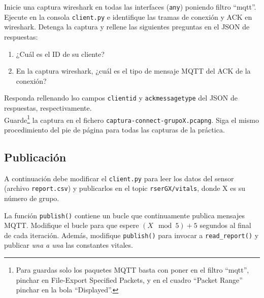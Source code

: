 \documentclass{upmassignment}
\begin{document}
\begin{problemlist}
    \pbitem Inicie una captura wireshark
        en todas las interfaces
        (\texttt{any}) poniendo filtro
        ``mqtt''. Ejecute en la consola
        \texttt{client.py} e identifique
        las tramas de conexión y ACK
        en wireshark. Detenga la captura
        y rellene las
        siguientes preguntas en el
        JSON de respuestas:
        \begin{enumerate}
            \item ¿Cuál es el ID de su cliente?
            \item En la captura wireshark,
                ¿cuál es el tipo de mensaje
                MQTT
                del ACK de la conexión?
        \end{enumerate}
        Responda rellenando lso campos
        \texttt{clientid} y
        \texttt{ackmessagetype} del JSON
        de respuestas, respectivamente.\\
        Guarde\footnote{Para guardas solo los paquetes MQTT
                basta con poner en el filtro
                ``mqtt'',
                pinchar en
                File-Export Specified Packets,
                y en el cuadro ``Packet
                Range'' pinchar en la
                bola  ``Displayed''.}
                la captura en el fichero
        \texttt{captura-connect-grupoX.pcapng}.
Siga el mismo procedimiento del
pie de página para todas las capturas
de la práctica.
\end{problemlist}



\subsection*{Publicación}
\noindent A continuación debe
modificar el \texttt{client.py} para
leer los datos del sensor
(archivo \texttt{report.csv}) y publicarlos
en el topic
\texttt{rserGX/vitals}, donde X
es su número de grupo.

La función \texttt{publish()}
contiene un bucle que continuamente publica
mensajes MQTT. Modifique el bucle
para que espere
$(X\mod{5}) + 5$ segundos al final de cada
iteración.
Además, modifique \texttt{publish()}
para invocar a \texttt{read\_report()} y
publicar \emph{una a una}
las constantes vitales.
\end{document}
